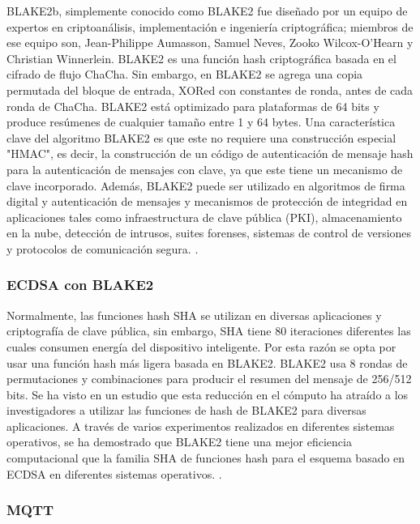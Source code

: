 \documentclass{article}
\begin{document}
                BLAKE2b, simplemente conocido como BLAKE2 fue diseñado por un equipo de expertos en criptoanálisis, implementación e ingeniería criptográfica; miembros de ese equipo son, Jean-Philippe Aumasson, Samuel Neves, Zooko Wilcox-O'Hearn y Christian Winnerlein. BLAKE2 es una función hash criptográfica basada en el cifrado de flujo ChaCha. Sin embargo, en BLAKE2 se agrega una copia permutada del bloque de entrada, XORed con constantes de ronda, antes de cada ronda de ChaCha. BLAKE2 está optimizado para plataformas de 64 bits y produce resúmenes de cualquier tamaño entre 1 y 64 bytes. Una característica clave del algoritmo BLAKE2 es que este no requiere una construcción especial "HMAC", es decir, la construcción de un código de autenticación de mensaje hash para la autenticación de mensajes con clave, ya que este tiene un mecanismo de clave incorporado. Además, BLAKE2 puede ser utilizado en algoritmos de firma digital y autenticación de mensajes y mecanismos de protección de integridad en aplicaciones tales como infraestructura de clave pública (PKI), almacenamiento en la nube, detección de intrusos, suites forenses, sistemas de control de versiones y protocolos de comunicación segura. \cite{BLAKE2_2017}.

            \subsubsection{ECDSA con BLAKE2}

                Normalmente, las funciones hash SHA se utilizan en diversas aplicaciones y criptografía de clave pública, sin embargo, SHA tiene 80 iteraciones diferentes las cuales consumen energía del dispositivo inteligente. Por esta razón se opta por usar una función hash más ligera basada en BLAKE2.  BLAKE2 usa 8 rondas de permutaciones y combinaciones para producir el resumen del mensaje de 256/512 bits. Se ha visto en un estudio que esta reducción en el cómputo ha atraído a los investigadores a utilizar las funciones de hash de BLAKE2 para diversas aplicaciones. A través de varios experimentos realizados en diferentes sistemas operativos, se ha demostrado que BLAKE2 tiene una mejor eficiencia computacional que la familia SHA de funciones hash para el esquema basado en ECDSA en diferentes sistemas operativos. \cite{9031038}.

            \subsubsection{MQTT}
\end{document}
